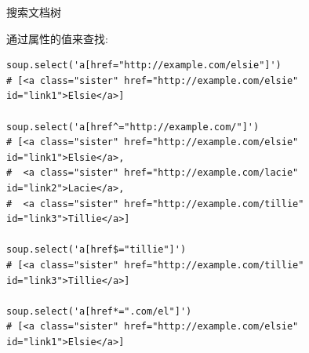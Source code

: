 \documentclass{beamer}
\begin{document}
\begin{frame}[t,fragile]{搜索文档树}

通过属性的值来查找:
\tiny

\begin{verbatim}
soup.select('a[href="http://example.com/elsie"]')
# [<a class="sister" href="http://example.com/elsie" id="link1">Elsie</a>]

soup.select('a[href^="http://example.com/"]')
# [<a class="sister" href="http://example.com/elsie" id="link1">Elsie</a>,
#  <a class="sister" href="http://example.com/lacie" id="link2">Lacie</a>,
#  <a class="sister" href="http://example.com/tillie" id="link3">Tillie</a>]

soup.select('a[href$="tillie"]')
# [<a class="sister" href="http://example.com/tillie" id="link3">Tillie</a>]

soup.select('a[href*=".com/el"]')
# [<a class="sister" href="http://example.com/elsie" id="link1">Elsie</a>]


\end{verbatim}
\end{frame}
\end{document}
